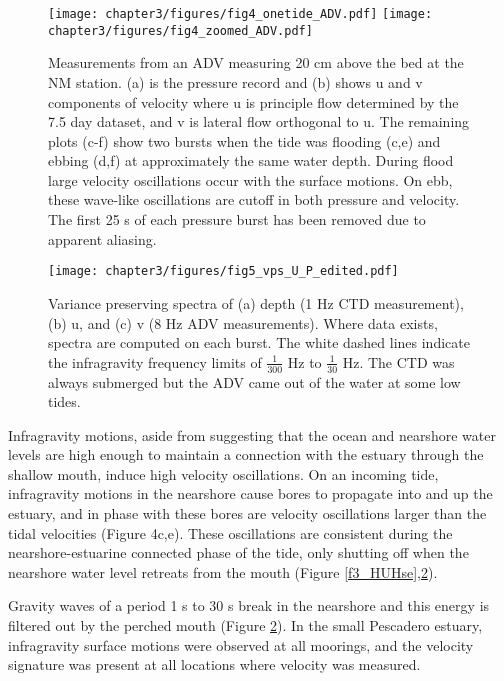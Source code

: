 \begin{figure}[tp]
\texttt{[image: chapter3/figures/fig4\_onetide\_ADV.pdf]}
\texttt{[image: chapter3/figures/fig4\_zoomed\_ADV.pdf]}
\protect\caption{Measurements from an ADV measuring 20 cm above the bed at the NM station.
(a) is the pressure record and (b) shows u and v components of velocity
where u is principle flow determined by the 7.5 day dataset, and v
is lateral flow orthogonal to u. The remaining plots (c-f) show two
bursts when the tide was flooding (c,e) and ebbing (d,f) at approximately
the same water depth. During flood large velocity oscillations occur
with the surface motions. On ebb, these wave-like oscillations are
cutoff in both pressure and velocity. The first 25 s of each pressure
burst has been removed due to apparent aliasing. \label{f5_adv}}
\end{figure}


\begin{figure}[tp]
\centering
\texttt{[image: chapter3/figures/fig5\_vps\_U\_P\_edited.pdf]}

\protect\caption{Variance preserving spectra of (a) depth (1 Hz CTD measurement), (b)
u, and (c) v (8 Hz ADV measurements). Where data exists, spectra are
computed on each burst. The white dashed lines indicate the infragravity
frequency limits of $\frac{1}{300}$ Hz to $\frac{1}{30}$ Hz. The
CTD was always submerged but the ADV came out of the water at some
low tides. \label{f6_spectra}}
\end{figure}

Infragravity motions, aside from suggesting that the ocean and nearshore
water levels are high enough to maintain a connection with the estuary
through the shallow mouth, induce high velocity oscillations. On an
incoming tide, infragravity motions in the nearshore cause bores to
propagate into and up the estuary, and in phase with these bores are
velocity oscillations larger than the tidal velocities (Figure 4c,e).
These oscillations are consistent during the nearshore-estuarine connected
phase of the tide, only shutting off when the nearshore water level
retreats from the mouth (Figure \ref{f3_HUHse},\ref{f6_spectra}). 

Gravity waves of a period 1 s to 30 s break in the nearshore and this
energy is filtered out by the perched mouth (Figure \ref{f6_spectra}).
In the small Pescadero estuary, infragravity surface motions were
observed at all moorings, and the velocity signature was present at
all locations where velocity was measured.


